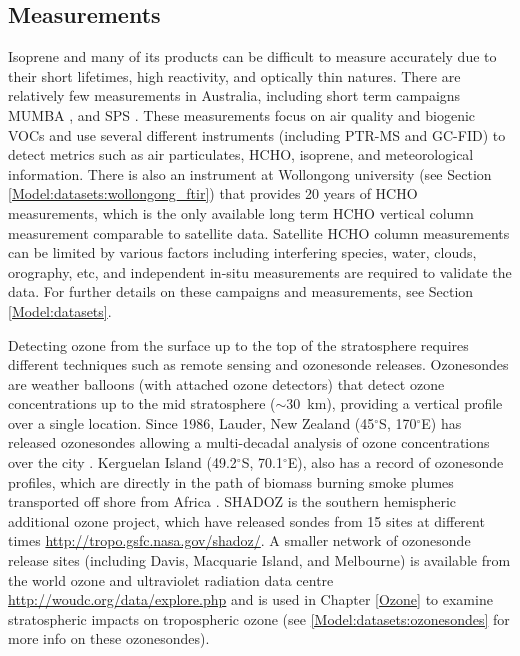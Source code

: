   
  \subsection{Measurements}
    
    Isoprene and many of its products can be difficult to measure accurately due to their short lifetimes, high reactivity, and optically thin natures.
    There are relatively few measurements in Australia, including short term campaigns MUMBA \parencite{PatonWalsh2017}, and SPS \parencite{Dunne2018}.
    These measurements focus on air quality and biogenic VOCs and use several different instruments (including PTR-MS and GC-FID) to detect metrics such as air particulates, HCHO, isoprene, and meteorological information.
    There is also an instrument at Wollongong university (see Section \ref{Model:datasets:wollongong_ftir}) that provides 20 years of HCHO measurements, which is the only available long term HCHO vertical column measurement comparable to satellite data. 
    Satellite HCHO column measurements can be limited by various factors including interfering species, water, clouds, orography, etc, and independent in-situ measurements are required to validate the data. %
    For further details on these campaigns and measurements, see Section \ref{Model:datasets}.
    
    Detecting ozone from the surface up to the top of the stratosphere requires different techniques such as remote sensing and ozonesonde releases.
    Ozonesondes are weather balloons (with attached ozone detectors) that detect ozone concentrations up to the mid stratosphere ($\sim 30$~km), providing a vertical profile over a single location.
    Since 1986, Lauder, New Zealand (45$^{\circ}$S, 170$^{\circ}$E) has released ozonesondes allowing a multi-decadal analysis of ozone concentrations over the city \parencite{Brinksma2002}.
    Kerguelan Island (49.2$^{\circ}$S, 70.1$^{\circ}$E), also has a record of ozonesonde profiles, which are directly in the path of biomass burning smoke plumes transported off shore from Africa \parencite{Baray2012}.
    SHADOZ is the southern hemispheric additional ozone project, which have released sondes from 15 sites at different times \url{http://tropo.gsfc.nasa.gov/shadoz/}.
    A smaller network of ozonesonde release sites (including Davis, Macquarie Island, and Melbourne) is available from the world ozone and ultraviolet radiation data centre \url{http://woudc.org/data/explore.php} and is used in Chapter \ref{Ozone} to examine stratospheric impacts on tropospheric ozone (see \ref{Model:datasets:ozonesondes} for more info on these ozonesondes).
  
